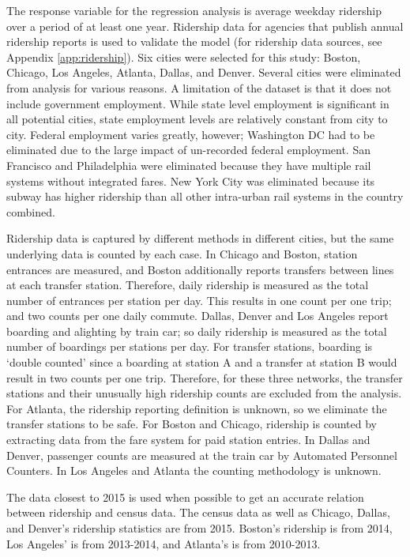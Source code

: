\documentclass[11pt]{article}
\begin{document}
The response variable for the regression analysis is average weekday ridership over a period of at least one year. Ridership data for agencies that publish annual ridership reports is used to validate the model (for ridership data sources, see Appendix \ref{app:ridership}). Six cities were selected for this study: Boston, Chicago, Los Angeles, Atlanta, Dallas, and Denver. Several cities were eliminated from analysis for various reasons. A limitation of the dataset is that it does not include government employment. While state level employment is significant in all potential cities, state employment levels are relatively constant from city to city. Federal employment varies greatly, however; Washington DC had to be eliminated due to the large impact of un-recorded federal employment. San Francisco and Philadelphia were eliminated because they have multiple rail systems without integrated fares. New York City was eliminated because its subway has higher ridership than all other intra-urban rail systems in the country combined.

Ridership data is captured by different methods in different cities, but the same underlying data is counted by each case. In Chicago and Boston, station entrances are measured, and Boston additionally reports transfers between lines at each transfer station. Therefore, daily ridership is measured as the total number of entrances per station per day. This results in one count per one trip; and two counts per one daily commute. Dallas, Denver and Los Angeles report boarding and alighting by train car; so daily ridership is measured as the total number of boardings per stations per day. For transfer stations, boarding is `double counted' since a boarding at station A and a transfer at station B would result in two counts per one trip. Therefore, for these three networks, the transfer stations and their unusually high ridership counts are excluded from the analysis. For Atlanta, the ridership reporting definition is unknown, so we eliminate the transfer stations to be safe. For Boston and Chicago, ridership is counted by extracting data from the fare system for paid station entries. In Dallas and Denver, passenger counts are measured at the train car by Automated Personnel Counters. In Los Angeles and Atlanta the counting methodology is unknown. 

The data closest to 2015 is used when possible to get an accurate relation between ridership and census data. The census data as well as Chicago, Dallas, and Denver's ridership statistics are from 2015. Boston's ridership is from 2014, Los Angeles' is from 2013-2014, and Atlanta's is from 2010-2013. 
\end{document}
